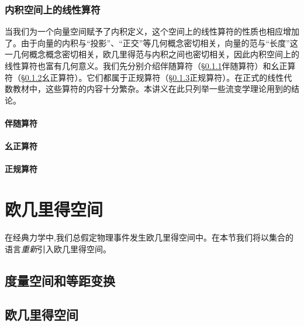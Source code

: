 \documentclass[zihao=-4,linespread=1.5,a4paper,heading=true,twoside]{ctexbook}
\theoremstyle{definition}
\theoremstyle{plain}
\begin{document}
\subsection{内积空间上的线性算符}\label{sec:II.2.4.2}
当我们为一个向量空间赋予了内积定义，这个空间上的线性算符的性质也相应增加了。由于向量的内积与“投影”、“正交”等几何概念密切相关，向量的范与“长度”这一几何概念概念密切相关，欧几里得范与内积之间也密切相关，因此内积空间上的线性算符也富有几何意义。我们先分别介绍伴随算符（\S \ref{sec:II.2.4.2_adjoint}伴随算符）和幺正算符（\S \ref{sec:II.2.4.2_unitary}幺正算符）。它们都属于正规算符（\S \ref{sec:II.2.4.2_normal}正规算符）。在正式的线性代数教材中，这些算符的内容十分繁杂。本讲义在此只列举一些流变学理论用到的结论。

\subsubsection{伴随算符}\label{sec:II.2.4.2_adjoint}

\subsubsection{幺正算符}\label{sec:II.2.4.2_unitary}

\subsubsection{正规算符}\label{sec:II.2.4.2_normal}





\chapter{欧几里得空间}
在经典力学中,我们总假定物理事件发生欧几里得空间中。在本节我们将以集合的语言\emph{重新}引入欧几里得空间。
\section{度量空间和等距变换}\label{sec:II.3.1}


\section{欧几里得空间}\label{sec:II.3.2}

\end{document}
